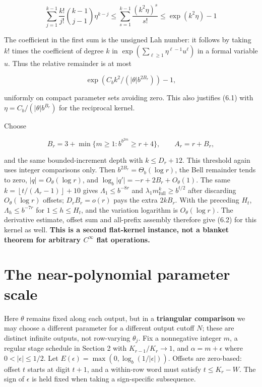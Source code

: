 \documentclass[11pt,a4paper]{article}
\begin{document}
\[
\sum_{j=1}^{k-1} \frac{k!}{j!} \binom{k-1}{j-1} \eta^{k-j}
\le  \sum_{s=1}^{k-1} \frac{(k^2\eta)^s}{s!} \le  \exp(k^2 \eta)-1
\]

The coefficient in the first sum is the unsigned Lah number: it follows
by taking \(k!\) times the coefficient of degree \(k\) in
\(\exp(\sum_{\ell\ge 1} \eta^{\ell-1} u^\ell)\) in a formal variable
\(u\). Thus the relative remainder is at most

\[
\exp(C_b k^2/(|\theta|b^{2B_r}))-1,
\]

uniformly on compact parameter sets avoiding zero. This also justifies
(6.1) with \(\eta=C_b/(|\theta|b^{B_r})\) for the reciprocal kernel.

Choose

\[
B_r=3+\min\lbrace m\ge 1: b^{b^{2m}}\ge r+4\rbrace ,\qquad A_r=r+B_r,
\]

and the same bounded-increment depth with \(k\le D_r+12\). This
threshold again uses integer comparisons only. Then
\(b^{2B_r}=\Theta_b(\log r)\), the Bell remainder tends to zero,
\(|q|=O_\theta(\log r)\), and \(\log_b|q'|=-r+2B_r+O_\theta(1)\). The
same \(k=\left\lfloor t/(A_r-1)\right\rfloor+10\) gives
\(\Lambda_1\le b^{-8r}\) and
\(\lambda_1 m_{\mathrm{full}}^k\ge b^{t/2}\) after discarding
\(O_\theta(\log r)\) offsets; \(D_r B_r=o(r)\) pays the extra
\(2k B_r\). With the preceding \(H_t\), \(\Lambda_h\le b^{-7r}\) for
\(1\le h\le H_t\), and the variation logarithm is \(O_\theta(\log r)\).
The derivative estimate, offset sum and all-prefix assembly therefore
give (6.2) for this kernel as well. \textbf{This is a second flat-kernel
instance, not a blanket theorem for arbitrary \(C^\infty\) flat
operations.}

\section{The near-polynomial parameter
scale}\label{the-near-polynomial-parameter-scale}

Here \(\theta\) remains fixed along each output, but in a
\textbf{triangular comparison} we may choose a different parameter for a
different output cutoff \(N\); these are distinct infinite outputs, not
row-varying \(\theta_j\). Fix a nonnegative integer \(m\), a regular
stage schedule in Section 2 with \(K_{r-1}/K_r \to  1\), and
\(\alpha=m+\epsilon\) where \(0< |\epsilon|\le 1/2\). Let
\(E(\epsilon)=\max(0,\log_b(1/|\epsilon|))\). Offsets are zero-based:
offset \(t\) starts at digit \(t+1\), and a within-row word must satisfy
\(t\le K_r-W\). The sign of \(\epsilon\) is held fixed when taking a
sign-specific subsequence.
\end{document}
